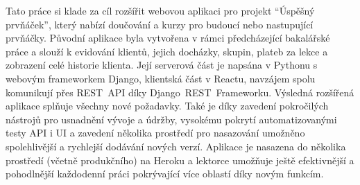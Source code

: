 Tato práce si klade za cíl rozšířit webovou aplikaci pro projekt \enquote{Úspěšný prvňáček}, který nabízí doučování a kurzy pro budoucí nebo nastupující prvňáčky. Původní aplikace byla vytvořena v rámci předcházející bakalářské práce a slouží k evidování klientů, jejich docházky, skupin, plateb za lekce a zobrazení celé historie klienta. Její serverová část je napsána v Pythonu s webovým frameworkem Django, klientská část v Reactu, navzájem spolu komunikují přes REST~API díky Django~REST~Frameworku. Výsledná rozšířená aplikace splňuje všechny nové požadavky. Také je díky zavedení pokročilých nástrojů pro usnadnění vývoje a údržby, vysokému pokrytí automatizovanými testy API i UI a zavedení několika prostředí pro nasazování umožněno spolehlivější a rychlejší dodávání nových verzí. Aplikace je nasazena do několika prostředí (včetně produkčního) na Heroku a lektorce umožňuje ještě efektivnější a pohodlnější každodenní práci pokrývající více oblastí díky novým funkcím.
